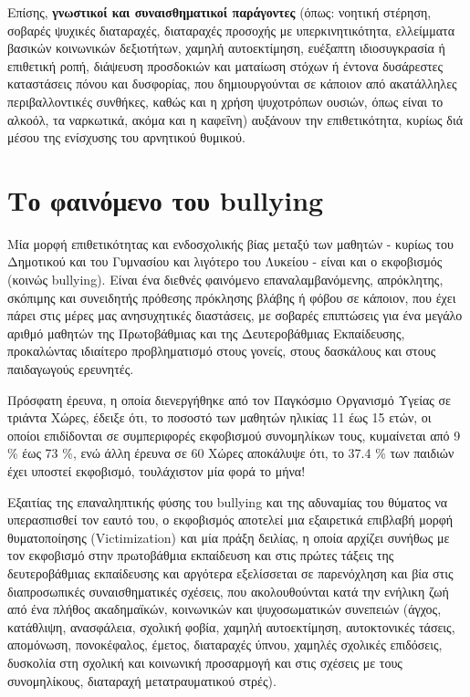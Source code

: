 \documentclass[12pt,a4paper,oneside]{book}
\begin{document}
\indent Επίσης, \textbf{γνωστικοί και συναισθηματικοί παράγοντες} (όπως: νοητική
στέρηση, σοβαρές ψυχικές διαταραχές, διαταραχές προσοχής με υπερκινητικότητα,
ελλείμματα βασικών κοινωνικών δεξιοτήτων, χαμηλή αυτοεκτίμηση, ευέξαπτη
ιδιοσυγκρασία ή επιθετική ροπή, διάψευση προσδοκιών και ματαίωση στόχων ή έντονα
δυσάρεστες καταστάσεις πόνου και δυσφορίας, που δημιουργούνται σε κάποιον από
ακατάλληλες περιβαλλοντικές συνθήκες, καθώς και η χρήση ψυχοτρόπων ουσιών, όπως
είναι το αλκοόλ, τα ναρκωτικά, ακόμα και η καφεΐνη) αυξάνουν την επιθετικότητα,
κυρίως διά μέσου της ενίσχυσης του αρνητικού θυμικού.
\section*{Το φαινόμενο του bullying}
\indent Μία μορφή επιθετικότητας και ενδοσχολικής βίας μεταξύ των μαθητών -
κυρίως του Δημοτικού και του Γυμνασίου και λιγότερο του Λυκείου - είναι και ο εκφοβισμός (κοινώς bullying). Είναι ένα
διεθνές φαινόμενο επαναλαμβανόμενης, απρόκλητης, σκόπιμης και συνειδητής
πρόθεσης πρόκλησης βλάβης ή φόβου σε κάποιον, που έχει πάρει στις μέρες μας
ανησυχητικές διαστάσεις, με σοβαρές επιπτώσεις για ένα μεγάλο αριθμό μαθητών της
Πρωτοβάθμιας και της Δευτεροβάθμιας Εκπαίδευσης, προκαλώντας ιδιαίτερο
προβληματισμό στους γονείς, στους δασκάλους και στους παιδαγωγούς ερευνητές.

\indent Πρόσφατη έρευνα, η οποία
διενεργήθηκε από τον Παγκόσμιο Οργανισμό Υγείας σε τριάντα Χώρες, έδειξε ότι, το
ποσοστό των μαθητών ηλικίας \num{11} έως \num{15} ετών, οι οποίοι επιδίδονται σε
συμπεριφορές εκφοβισμού συνομηλίκων τους, κυμαίνεται από \num{9} \% έως
\num{73} \%, ενώ άλλη έρευνα σε \num{60} Xώρες αποκάλυψε ότι, το \num{37,4} \%
των παιδιών έχει υποστεί εκφοβισμό, τουλάχιστον μία φορά το μήνα!

\indent Εξαιτίας της επαναληπτικής φύσης του bullying και της αδυναμίας του
θύματος να υπερασπισθεί τον εαυτό του, ο εκφοβισμός αποτελεί μια εξαιρετικά επιβλαβή μορφή θυματοποίησης (Victimization)
και μία πράξη δειλίας, η οποία αρχίζει συνήθως με τον εκφοβισμό στην πρωτοβάθμια
εκπαίδευση και στις πρώτες τάξεις της δευτεροβάθμιας εκπαίδευσης και αργότερα
εξελίσσεται σε παρενόχληση και βία στις διαπροσωπικές συναισθηματικές σχέσεις,
που ακολουθούνται κατά την ενήλικη ζωή από ένα πλήθος ακαδημαϊκών, κοινωνικών
και ψυχοσωματικών συνεπειών (άγχος, κατάθλιψη, ανασφάλεια, σχολική φοβία,
χαμηλή αυτοεκτίμηση, αυτοκτονικές τάσεις, απομόνωση, πονοκέφαλος, έμετος,
διαταραχές ύπνου, χαμηλές σχολικές επιδόσεις, δυσκολία στη σχολική και
κοινωνική προσαρμογή και στις σχέσεις με τους συνομηλίκους, διαταραχή
μετατραυματικού στρές).
\end{document}
